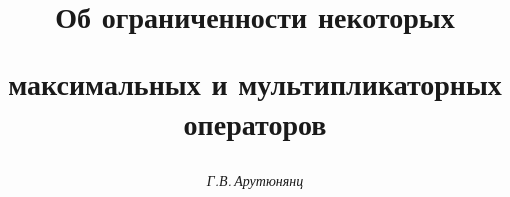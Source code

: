 









\newcommand{\tts}[1]{}







\setcounter{page}{17}















\author{\it Г.В.\,Арутюнянц}




\title{Об ограниченности некоторых


максимальных и мультипликаторных операторов}





\date{}




\pagestyle{plain} %







\maketitle


\label{begin}





